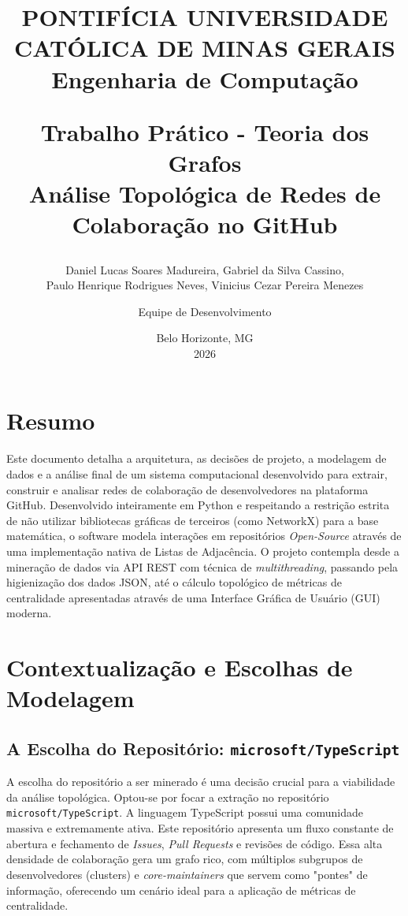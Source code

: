 \documentclass[12pt, a4paper]{article}
\title{
    \vspace{-2cm}
    \begin{center}
        \large\textbf{PONTIFÍCIA UNIVERSIDADE CATÓLICA DE MINAS GERAIS}\\
        Engenharia de Computação
    \end{center}
    \vspace{2cm}
    \Large\textbf{Trabalho Prático - Teoria dos Grafos}\\
    \large Análise Topológica de Redes de Colaboração no GitHub
}
\author{Daniel Lucas Soares Madureira, Gabriel da Silva Cassino, \\
Paulo Henrique Rodrigues Neves, Vinicius Cezar Pereira Menezes
 \and Equipe de Desenvolvimento}
\date{Belo Horizonte, MG\\2026}
\begin{document}
\maketitle
\thispagestyle{empty}
\newpage

\tableofcontents
\newpage

\section{Resumo}
Este documento detalha a arquitetura, as decisões de projeto, a modelagem de dados e a análise final de um sistema computacional desenvolvido para extrair, construir e analisar redes de colaboração de desenvolvedores na plataforma GitHub. Desenvolvido inteiramente em Python e respeitando a restrição estrita de não utilizar bibliotecas gráficas de terceiros (como NetworkX) para a base matemática, o software modela interações em repositórios \textit{Open-Source} através de uma implementação nativa de Listas de Adjacência. O projeto contempla desde a mineração de dados via API REST com técnica de \textit{multithreading}, passando pela higienização dos dados JSON, até o cálculo topológico de métricas de centralidade apresentadas através de uma Interface Gráfica de Usuário (GUI) moderna.

\section{Contextualização e Escolhas de Modelagem}

\subsection{A Escolha do Repositório: \texttt{microsoft/TypeScript}}
A escolha do repositório a ser minerado é uma decisão crucial para a viabilidade da análise topológica. Optou-se por focar a extração no repositório \texttt{microsoft/TypeScript}. A linguagem TypeScript possui uma comunidade massiva e extremamente ativa. Este repositório apresenta um fluxo constante de abertura e fechamento de \textit{Issues}, \textit{Pull Requests} e revisões de código. Essa alta densidade de colaboração gera um grafo rico, com múltiplos subgrupos de desenvolvedores (clusters) e \textit{core-maintainers} que servem como "pontes" de informação, oferecendo um cenário ideal para a aplicação de métricas de centralidade.
\end{document}
